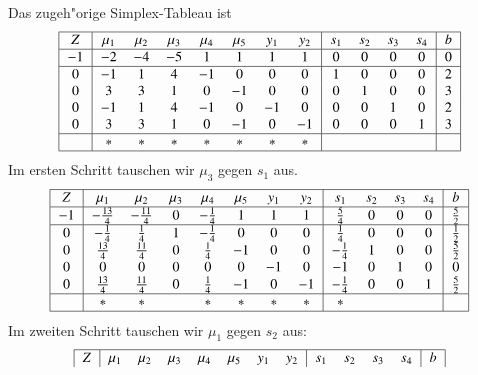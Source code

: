 \begin{beispiel}
Das zugeh"orige Simplex-Tableau ist
\[
\begin{tabular}{|>{$}c<{$}|>{$}c<{$}>{$}c<{$}>{$}c<{$}>{$}c<{$}>{$}c<{$}>{$}c<{$}>{$}c<{$}|>{$}c<{$}>{$}c<{$}>{$}c<{$}>{$}c<{$}|>{$}c<{$}|}
\hline
Z&\mu_1&\mu_2&\mu_3&\mu_4&\mu_5&y_1&y_2&s_1&s_2&s_3&s_4&b\\
\hline
-1&  -2&   -4&   -5&    1&    1&  1&  1&  0&  0&  0&  0&0\\
\hline
 0&  -1&    1&    4&   -1&    0&  0&  0&  1&  0&  0&  0&2\\
 0&   3&    3&    1&    0&   -1&  0&  0&  0&  1&  0&  0&3\\
 0&  -1&    1&    4&   -1&    0& -1&  0&  0&  0&  1&  0&2\\
 0&   3&    3&    1&    0&   -1&  0& -1&  0&  0&  0&  1&3\\
\hline
  &   *&    *&    *&    *&    *&  *&  *&   &   &   &   & \\
\hline
\end{tabular}
\]
Im ersten Schritt tauschen wir $\mu_3$ gegen $s_1$ aus.
\[
\begin{tabular}{|>{$}c<{$}|>{$}c<{$}>{$}c<{$}>{$}c<{$}>{$}c<{$}>{$}c<{$}>{$}c<{$}>{$}c<{$}|>{$}c<{$}>{$}c<{$}>{$}c<{$}>{$}c<{$}|>{$}c<{$}|}
\hline
Z&       \mu_1&      \mu_2&\mu_3&   \mu_4&\mu_5&y_1&y_2&     s_1&s_2&s_3&s_4&      b\\
\hline
-1&-\frac{13}4&-\frac{11}4&    0&-\frac14&    1&  1&  1& \frac54&  0&  0&  0&\frac52\\
\hline
 0&   -\frac14&    \frac14&    1&-\frac14&    0&  0&  0& \frac14&  0&  0&  0&\frac12\\
 0& \frac{13}4& \frac{11}4&    0& \frac14&   -1&  0&  0&-\frac14&  1&  0&  0&\frac52\\
 0&          0&          0&    0&       0&    0& -1&  0&      -1&  0&  1&  0&      0\\
 0& \frac{13}4& \frac{11}4&    0& \frac14&   -1&  0& -1&-\frac14&  0&  0&  1&\frac52\\
\hline
  &          *&          *&     &       *&    *&  *&  *&       *&   &   &   &       \\
\hline
\end{tabular}
\]
Im zweiten Schritt tauschen wir $\mu_1$ gegen $s_2$ aus:
\[
\begin{tabular}{|>{$}c<{$}|>{$}c<{$}>{$}c<{$}>{$}c<{$}>{$}c<{$}>{$}c<{$}>{$}c<{$}>{$}c<{$}|>{$}c<{$}>{$}c<{$}>{$}c<{$}>{$}c<{$}|>{$}c<{$}|}
\hline
Z&         \mu_1&        \mu_2&\mu_3&       \mu_4&        \mu_5&y_1&y_2&          s_1&         s_2&s_3&s_4&      b\\

\end{tabular}\]
\end{beispiel}

